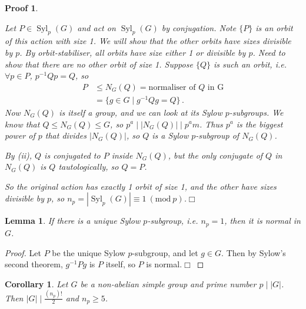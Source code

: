 \documentclass{article}
\theoremstyle{plain}\theoremheaderfont{\normalfont\itshape}\theorembodyfont{\rmfamily}\theoremseparator{.}\newtheorem*{rem}{Remark}\newtheorem*{ex}{Example}\newtheorem*{proof}{Proof}\newtheorem*{altp}{Alternative proof}\newtheorem*{nonex}{Non-Example}
\theoremstyle{plain}\theoremheaderfont{\normalfont\bfseries}\theorembodyfont{\rmfamily}\theoremseparator{.}\newtheorem{thm}{Theorem}[section]\newtheorem{lem}[thm]{Lemma}\newtheorem{prop}[thm]{Proposition}\newtheorem*{cor}{Corollary}\newtheorem{defn}[thm]{Definition}\newtheorem{clm}[thm]{Claim}\newtheorem{clminproof}{Claim}\newtheorem*{notn}{Notation}\newtheorem*{exer}{Exercise}\newtheorem*{lemnn}{Lemma}
\theoremstyle{break}\theoremheaderfont{\normalfont\itshape}\theorembodyfont{\rmfamily}\theoremseparator{.\medskip}\newtheorem*{proofskip}{Proof}\newtheorem*{exs}{Examples}\newtheorem*{rems}{Remarks}\newtheorem*{obs}{Observations}
\theoremstyle{break}\theoremheaderfont{\normalfont\bfseries}\theorembodyfont{\rmfamily}\theoremseparator{.\medskip}\newtheorem{lemskip}[thm]{Lemma}\newtheorem{defnskip}[thm]{Definition}\newtheorem{propskip}[thm]{Proposition}\newtheorem{thmskip}[thm]{Theorem}
\numberwithin{equation}{section}
\newcommand{\qed}{\hfill\ensuremath{\Box}}
\newcommand{\abs}[1]{\left|#1\right|}
\DeclareMathOperator{\Syl}{Syl}
\newcommand{\MOD}[1]{\ (\mathrm{mod} \ #1)}
\begin{document}
\begin{proofskip}
\begin{enumerate}[topsep=0pt,label=(\roman*)]
            Let \(P\in\Syl_p(G)\) and act on \(\Syl_p(G)\) by conjugation. Note \(\{P\}\) is an orbit of this action with size 1. We will show that the other orbits have sizes divisible by \(p\). By orbit-stabiliser, all orbits have size either 1 or divisible by \(p\). Need to show that there are no other orbit of size 1. Suppose \(\{Q\}\) is such an orbit, i.e. \(\forall p\in P\), \(p^{-1}Qp=Q\), so
            \begin{align*}
                P&\le N_G(Q)=\text{normaliser of }Q\text{ in G}\\
                &=\{g\in G\mid g^{-1}Qg=Q\}\,.
            \end{align*}
            Now \(N_G(Q)\) is itself a group, and we can look at its Sylow \(p\)-subgroups. We know that \(Q\le N_G(Q)\le G\), so \(p^a\mid\abs{N_G(Q)}\mid p^a m\). Thus \(p^a\) is the biggest power of \(p\) that divides \(\abs{N_G(Q)}\), so \(Q\) is a Sylow \(p\)-subgroup of \(N_G(Q)\).

            By (ii), \(Q\) is conjugated to \(P\) inside \(N_G(Q)\), but the only conjugate of \(Q\) in \(N_G(Q)\) is \(Q\) tautologically, so \(Q=P\).

            So the original action has exactly 1 orbit of size 1, and the other have sizes divisible by \(p\), so \(n_p=\abs{\Syl_p(G)}\equiv 1\MOD{p}\).\qed
        \end{enumerate}
    \end{proofskip}
    \begin{lem}
        If there is a unique Sylow \(p\)-subgroup, i.e. \(n_p=1\), then it is normal in \(G\). 
    \end{lem}
    \begin{proof}
        Let \(P\) be the unique Sylow \(p\)-subgroup, and let \(g\in G\). Then by Sylow's second theorem, \(g^{-1}Pg\) is \(P\) itself, so \(P\) is normal.\qed 
    \end{proof}
    \begin{cor}
        Let \(G\) be a non-abelian simple group and prime number \(p\mid\abs{G}\). Then \(\abs{G}\mid\frac{(n_p)!}{2}\) and \(n_p\ge 5\).
    \end{cor}
\end{document}
